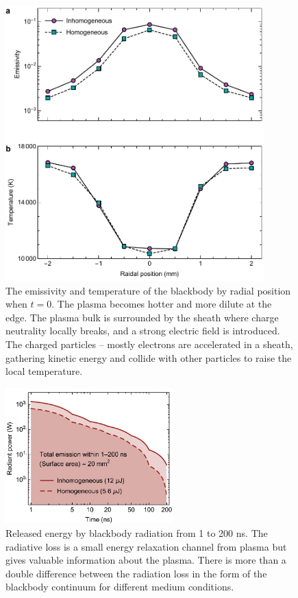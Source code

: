 \begin{figure}[ht!]
\centering
\includegraphics[width=100mm]{figures/ch4/blackbody/radial.pdf}
\caption{The emissivity and temperature of the blackbody by radial position when $t = 0$. The plasma becomes hotter and more dilute at the edge. The plasma bulk is surrounded by the sheath where charge neutrality locally breaks, and a strong electric field is introduced. The charged particles -- mostly electrons are accelerated in a sheath, gathering kinetic energy and collide with other particles to raise the local temperature.}
\label{fig:blackbodyRadial}
\end{figure}

\begin{figure}[ht!]
\centering
\includegraphics[width=65mm]{figures/ch4/blackbody/loss.pdf}
\caption{Released energy by blackbody radiation from 1 to 200 ns. The radiative loss is a small energy relaxation channel from plasma but gives valuable information about the plasma. There is more than a double difference between the radiation loss in the form of the blackbody continuum for different medium conditions.}
\label{fig:emissionLoss}
\end{figure}

